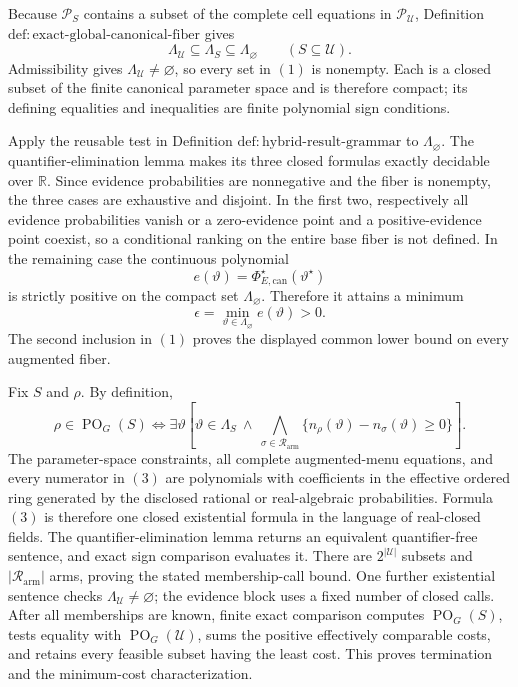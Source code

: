 Because \(\mathcal P_S\) contains a subset of the complete cell equations in \(\mathcal P_{\mathcal U}\), Definition \(\mathrm{def:exact\text{-}global\text{-}canonical\text{-}fiber}\) gives
\[
\Lambda_{\mathcal U}\subseteq\Lambda_S\subseteq\Lambda_{\varnothing}
\qquad(S\subseteq\mathcal U).
\tag{1}
\]
Admissibility gives \(\Lambda_{\mathcal U}\ne\varnothing\), so every set in \((1)\) is nonempty.  Each is a closed subset of the finite canonical parameter space and is therefore compact; its defining equalities and inequalities are finite polynomial sign conditions.

Apply the reusable test in Definition \(\mathrm{def:hybrid\text{-}result\text{-}grammar}\) to \(\Lambda_{\varnothing}\).  The quantifier-elimination lemma makes its three closed formulas exactly decidable over \(\mathbb R\).  Since evidence probabilities are nonnegative and the fiber is nonempty, the three cases are exhaustive and disjoint.  In the first two, respectively all evidence probabilities vanish or a zero-evidence point and a positive-evidence point coexist, so a conditional ranking on the entire base fiber is not defined.  In the remaining case the continuous polynomial
\[
e(\vartheta)=\Phi_{E,\mathrm{can}}^\star(\vartheta^\star)
\]
is strictly positive on the compact set \(\Lambda_{\varnothing}\).  Therefore it attains a minimum
\[
\epsilon=\min_{\vartheta\in\Lambda_{\varnothing}}e(\vartheta)>0.
\tag{2}
\]
The second inclusion in \((1)\) proves the displayed common lower bound on every augmented fiber.

Fix \(S\) and \(\rho\).  By definition,
\[
\rho\in\operatorname{PO}_G(S)
\Longleftrightarrow
\exists\vartheta\left[
\vartheta\in\Lambda_S\ \wedge\
\bigwedge_{\sigma\in\mathcal R_{\mathrm{arm}}}
\{n_\rho(\vartheta)-n_\sigma(\vartheta)\geq0\}
\right].
\tag{3}
\]
The parameter-space constraints, all complete augmented-menu equations, and every numerator in \((3)\) are polynomials with coefficients in the effective ordered ring generated by the disclosed rational or real-algebraic probabilities.  Formula \((3)\) is therefore one closed existential formula in the language of real-closed fields.  The quantifier-elimination lemma returns an equivalent quantifier-free sentence, and exact sign comparison evaluates it.  There are \(2^{|\mathcal U|}\) subsets and \(|\mathcal R_{\mathrm{arm}}|\) arms, proving the stated membership-call bound.  One further existential sentence checks \(\Lambda_{\mathcal U}\ne\varnothing\); the evidence block uses a fixed number of closed calls.  After all memberships are known, finite exact comparison computes \(\operatorname{PO}_G(S)\), tests equality with \(\operatorname{PO}_G(\mathcal U)\), sums the positive effectively comparable costs, and retains every feasible subset having the least cost.  This proves termination and the minimum-cost characterization.

